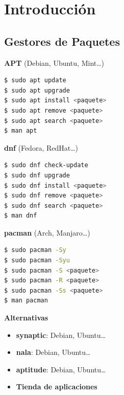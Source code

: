 \documentclass[aspectratio=43]{beamer}
\begin{document}
    \section{Introducción}
    \subsection{Gestores de Paquetes}
    \begin{frame}[fragile]{\secname}{\subsecname}
        \begin{multicols}{2}
            \textbf{APT} (Debian, Ubuntu, Mint\ldots)\\
            \begin{lstlisting}[language=bash]
$ sudo apt update
$ sudo apt upgrade
$ sudo apt install <paquete>
$ sudo apt remove <paquete>
$ sudo apt search <paquete>
$ man apt \end{lstlisting}
            \textbf{dnf} (Fedora, RedHat\ldots)\\
            \begin{lstlisting}[language=bash]
$ sudo dnf check-update
$ sudo dnf upgrade
$ sudo dnf install <paquete>
$ sudo dnf remove <paquete>
$ sudo dnf search <paquete>
$ man dnf \end{lstlisting}
            \newpage
            \textbf{pacman} (Arch, Manjaro\ldots)\\
            \begin{lstlisting}[language=bash]
$ sudo pacman -Sy
$ sudo pacman -Syu
$ sudo pacman -S <paquete>
$ sudo pacman -R <paquete>
$ sudo pacman -Ss <paquete>
$ man pacman \end{lstlisting}
            \textbf{Alternativas}
            \begin{itemize}
                \item \textbf{synaptic}: Debian, Ubuntu\ldots
                \item \textbf{nala}: Debian, Ubuntu\ldots
                \item \textbf{aptitude}: Debian, Ubuntu\ldots
                \item \textbf{Tienda de aplicaciones}
            \end{itemize}
        \end{multicols}
    \end{frame}
\end{document}
